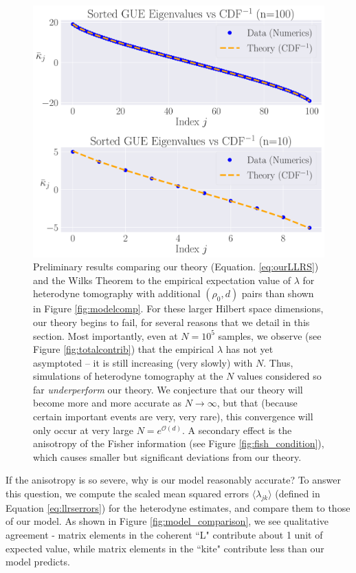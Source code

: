 \documentclass[aps,pra, twocolumn]{revtex4}
\begin{document}
\begin{figure}[h!]
\includegraphics[width=\columnwidth]{Images/Figure_8.pdf}
 \caption{Preliminary results comparing our theory (Equation. \ref{eq:ourLLRS}) and the Wilks Theorem to the empirical expectation value of $\lambda$ for heterodyne tomography with additional $(\rho_{0}, d)$ pairs than shown in Figure \ref{fig:modelcomp}.  For these larger Hilbert space dimensions, our theory begins to fail, for several reasons that we detail in this section.  Most importantly, even at $N=10^5$ samples, we observe (see Figure \ref{fig:totalcontrib}) that the empirical $\lambda$ has not yet asymptoted -- it is still increasing (very slowly) with $N$.  Thus, simulations of heterodyne tomography at the $N$ values considered so far \emph{underperform} our theory.  We conjecture that our theory will become more and more accurate as $N\to\infty$, but that (because certain important events are very, very rare), this convergence will only occur at very large $N = e^{\mathcal{O}(d)}$.  A secondary effect is the anisotropy of the Fisher information (see Figure \ref{fig:fish_condition}), which causes smaller but significant deviations from our theory.}
\label{fig:modelcomp2}
\end{figure}




If the anisotropy is so severe, why is our model reasonably accurate? To answer this question, we compute the scaled mean squared errors $\langle \lambda_{jk}\rangle$ (defined in Equation \eqref{eq:llrserrors}) for the heterodyne estimates, and compare them to those of our model. As shown in Figure \ref{fig:model_comparison}, we see qualitative agreement - matrix elements in the coherent ``L" contribute about 1 unit of 
expected value, while matrix elements in the ``kite" contribute less than our model predicts.
\end{document}
